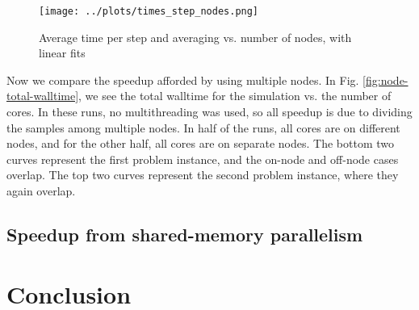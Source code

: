 \documentclass{article}
\begin{document}
\begin{figure}
    \centering
    \texttt{[image: ../plots/times\_step\_nodes.png]}
    \caption{Average time per step and averaging vs. number of nodes, with 
    linear fits}
    \label{fig:node-average-step}
\end{figure}

Now we compare the speedup afforded by using multiple nodes. In Fig. \ref{fig:node-total-walltime}, we see the 
total walltime for the simulation vs. the number of cores. In these runs, no multithreading was used, so 
all speedup is due to dividing the samples among multiple nodes. In half of the runs, all cores are on different nodes,
and for the other half, all cores are on separate nodes. The bottom two curves represent the first problem instance,
and the on-node and off-node cases overlap. The top two curves represent the second problem instance, where they 
again overlap.

\subsection{Speedup from shared-memory parallelism}

\section{Conclusion} \label{conclusion}
\end{document}
